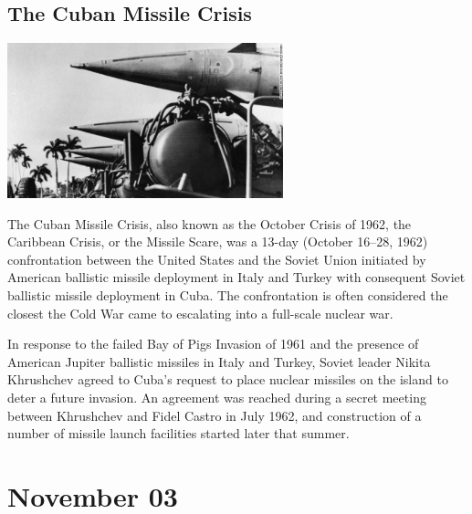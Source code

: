 \documentclass[11pt]{report}
\begin{document}
\subsection{The Cuban Missile Crisis}
\vspace{2mm}\begin{center}\includegraphics[width=8cm]{./img/cubaMissileCsis.jpg}\end{center}
The Cuban Missile Crisis, also known as the October Crisis of 1962, the Caribbean Crisis, or the Missile Scare, was a 13-day (October 16–28, 1962) confrontation between the United States and the Soviet Union initiated by American ballistic missile deployment in Italy and Turkey with consequent Soviet ballistic missile deployment in Cuba. The confrontation is often considered the closest the Cold War came to escalating into a full-scale nuclear war.

In response to the failed Bay of Pigs Invasion of 1961 and the presence of American Jupiter ballistic missiles in Italy and Turkey, Soviet leader Nikita Khrushchev agreed to Cuba's request to place nuclear missiles on the island to deter a future invasion. An agreement was reached during a secret meeting between Khrushchev and Fidel Castro in July 1962, and construction of a number of missile launch facilities started later that summer.

\section{November 03}
\end{document}
